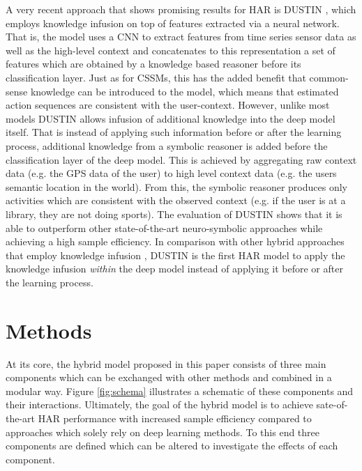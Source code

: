 \documentclass[11pt,titlepage,oneside,openany]{book}
\begin{document}
A very recent approach that shows promising results for HAR is DUSTIN \cite{arrotta_knowledge_2022}, which employs knowledge infusion on top of features extracted via a neural network. That is, the model uses a CNN to extract features from time series sensor data as well as the high-level context and concatenates to this representation a set of features which are obtained by a knowledge based reasoner before its classification layer. Just as for CSSMs, this has the added benefit that common-sense knowledge can be introduced to the model, which means that estimated action sequences are consistent with the user-context. However, unlike most models DUSTIN allows infusion of additional knowledge into the deep model itself. That is instead of applying such information before or after the learning process, additional knowledge from a symbolic reasoner is added before the classification layer of the deep model. This is achieved by aggregating raw context data (e.g. the GPS data of the user) to high level context data (e.g. the users semantic location in the world). From this, the symbolic reasoner produces only activities which are consistent with the observed context (e.g. if the user is at a library, they are not doing sports). The evaluation of DUSTIN shows that it is able to outperform other state-of-the-art neuro-symbolic approaches while achieving a high sample efficiency. In comparison with other hybrid approaches that employ knowledge infusion \cite{bettini_caviar_2020, sukor_hybrid_2019}, DUSTIN is the first HAR model to apply the knowledge infusion \emph{within} the deep model instead of applying it before or after the learning process.


\chapter{Methods}
\label{cha:alg}

At its core, the hybrid model proposed in this paper consists of three main components which can be exchanged with other methods and combined in a modular way. Figure \ref{fig:schema} illustrates a schematic of these components and their interactions. Ultimately, the goal of the hybrid model is to achieve sate-of-the-art HAR performance with increased sample efficiency compared to approaches which solely rely on deep learning methods. To this end three components are defined which can be altered to investigate the effects of each component.
\end{document}
